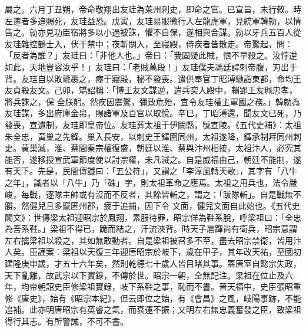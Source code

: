 \begin{pinyinscope}
 屬之。六月丁丑朔，帝命敬翔出友珪為萊州刺史，即命之官。已宣旨，未行敕。時左遷者多追賜死，友珪益恐。戊寅，友珪易服微行入左龍虎軍，見統軍韓勍，以情告之。勍亦見功臣宿將多以小過被誅，懼不自保，遂相與合謀。勍以牙兵五百人從友珪雜控鶴士入，伏于禁中；夜斬關入，至寢殿，侍疾者皆散走。帝驚起，問：「反者為誰？」友珪曰：「非他人也。」帝曰：「我固疑此賊，恨不早殺之。汝悖逆如此，天地豈容汝乎！」友珪曰：「老賊萬段！」友珪僕夫馮廷諤刺帝腹，刃出于背。友珪自以敗氈裹之，瘞于寢殿，秘不發喪。遣供奉官丁昭溥馳詣東都，命均王友貞殺友文。己卯，矯詔稱：「博王友文謀逆，遣兵突入殿中，賴郢王友珮忠孝，將兵誅之，保
 全朕躬。然疾因震驚，彌致危殆，宜令友珪權主軍國之務。」韓勍為友珪謀，多出府庫金帛，賜諸軍及百官以取悅。辛巳，丁昭溥還，聞友文已死，乃發喪，宣遺制，友珪即皇帝位。友珪葬太祖于伊闕縣，號宣陵。《五代史補》：太祖朱全忠，黃巢之先鋒。巢入長安，以刺史王鐸圍同州，太祖遂降，鐸承制拜同州刺史。黃巢滅，淮、蔡間秦宗權復盛，朝廷以淮、蔡與汴州相接，太祖汴人，必究其能否，遂移授宣武軍節度使以討宗權，未凡滅之。自是威福由己，朝廷不能制，遂有天下。先是，民間傳讖曰：「五公符」，又謂之「李淳風轉天歌」，其字有「八牛之年」，識者以「八牛」乃「硃」字，則太祖革命之應焉。太祖之用兵也，法令嚴峻，每戰，逐隊主帥或有沒而不反者，其餘皆斬之，謂之：「跋隊斬」。自是戰無不勝。然健兒且多竄匿州郡，疲于追捕，因下令
 文面，健兒文面自此始也。《五代史闕文》：世傳梁太祖迎昭宗於鳳翔，素服待罪，昭宗佯為鞋系脫，呼梁祖曰：「全忠為吾系鞋。」梁祖不得已，跪而結之，汗流浹背。時天子扈蹕尚有衛兵，昭宗意謂左右擒梁祖以殺之，其如無敢動者。自是梁祖被召多不至，盡去昭宗禁衛，皆用汴人矣。臣謹案：梁祖以天復三年迎唐昭宗於岐下，歲在甲子，其年改天祐，至國初建隆庚申歲，才五十六年矣，然則乾德七十歲人皆目睹其事。蓋唐室自懿宗失政，天下亂離，故武宗以下實錄，不傳於世。昭宗一朝，全無記注。梁祖在位止及六年，均帝朝詔史臣修梁祖實錄，岐下系鞋之事，恥而不書。晉天福中，史臣張昭重修《唐史》，始有《昭宗本紀》，但云即位之始，有《會昌》之風，岐陽事跡，不能追補。此亦明唐昭宗有英睿之氣，而衰運不振；又明左右無忠義奮發之臣，致梁祖得行其志。有所警誡，不可不書。



\end{pinyinscope}